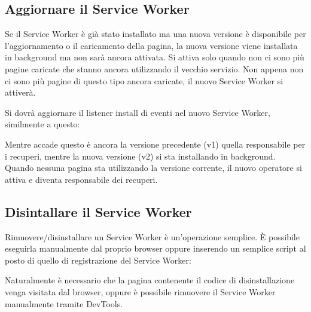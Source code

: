 \documentclass[11pt ,a4paper , twoside , openright ]{book}
\begin{document}
	\subsection{Aggiornare il Service Worker}
	Se il Service Worker è già stato installato ma una nuova versione è disponibile per l'aggiornamento o il caricamento della pagina, la nuova versione viene installata in background ma non sarà ancora attivata. Si attiva solo quando non ci sono più pagine caricate che stanno ancora utilizzando il vecchio servizio. Non appena non ci sono più pagine di questo tipo ancora caricate, il nuovo Service Worker si attiverà.
	
	Si dovrà aggiornare il listener install di eventi nel nuovo Service Worker, similmente a questo:
	
	Mentre accade questo è ancora la versione precedente (v1) quella responsabile per i recuperi, mentre la nuova versione (v2) si sta installando in background.
	Quando nessuna pagina sta utilizzando la versione corrente, il nuovo operatore si attiva e diventa responsabile dei recuperi.
	
	\subsection{Disintallare il Service Worker}
	
	Rimuovere/disinstallare un Service Worker è un’operazione semplice. È possibile eseguirla manualmente dal proprio browser oppure inserendo un semplice script al posto di quello di registrazione del Service Worker:
	
	Naturalmente è necessario che la pagina contenente il codice di disinstallazione venga visitata dal browser, oppure è possibile rimuovere il Service Worker manualmente tramite DevTools.
	\newpage
\end{document}
